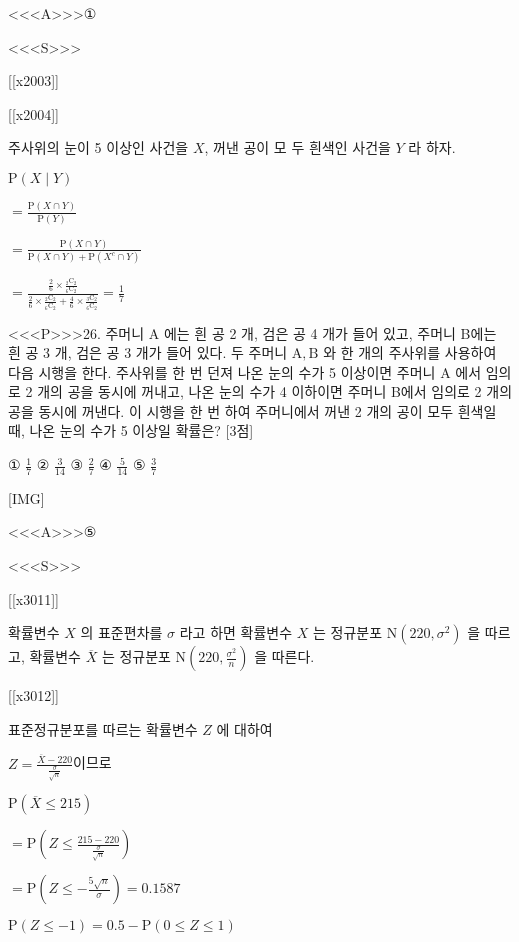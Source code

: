 \documentclass{oblivoir}
\begin{document}
<<<A>>>①

<<<S>>>

[[x2003]]

[[x2004]]

주사위의 눈이 5 이상인 사건을 $X$, 꺼낸 공이 모 두 흰색인 사건을 $Y$ 라 하자.

$\mathrm{P}(X \mid Y) $

$=\frac{\mathrm{P}(X \cap Y)}{\mathrm{P}(Y)}$

$=\frac{\mathrm{P}(X \cap Y)}{\mathrm{P}(X \cap Y)+\mathrm{P}\left(X^{c} \cap Y\right)}$

$=\frac{\frac{2}{6} \times \frac{{ }_{2} \mathrm{C}_{2}}{{ }_{6} \mathrm{C}_{2}}}{\frac{2}{6} \times \frac{{ }_{2} \mathrm{C}_{2}}{{ }_{6} \mathrm{C}_{2}}+\frac{4}{6} \times \frac{{ }_{3} \mathrm{C}_{2}}{{ }_{6} \mathrm{C}_{2}}}=\frac{1}{7}$


<<<P>>>26. 주머니 $\mathrm{A}$ 에는 흰 공 2 개, 검은 공 4 개가 들어 있고, 주머니 B에는 흰 공 3 개, 검은 공 3 개가 들어 있다.
두 주머니 $\mathrm{A}, \mathrm{B}$ 와 한 개의 주사위를 사용하여 다음 시행을 한다.
주사위를 한 번 던져
나온 눈의 수가 5 이상이면
주머니 $\mathrm{A}$ 에서 임의로 2 개의 공을 동시에 꺼내고,
나온 눈의 수가 4 이하이면
주머니 B에서 임의로 2 개의 공을 동시에 꺼낸다.
이 시행을 한 번 하여 주머니에서 꺼낸 2 개의 공이 모두 흰색일 때, 나온 눈의 수가 5 이상일 확률은? [3점]

① $\frac{1}{7}$
② $\frac{3}{14}$
③ $\frac{2}{7}$
④ $\frac{5}{14}$
⑤ $\frac{3}{7}$

[IMG]

<<<A>>>⑤

<<<S>>>

[[x3011]]

확률변수 $X$ 의 표준편차를 $\sigma$ 라고 하면
확률변수 $X$ 는 정규분포 $\mathrm{N}\left(220, \sigma^{2}\right)$ 을 따르고,
확률변수 $\overline{X}$ 는 정규분포 $\mathrm{N}\left(220, \frac{\sigma^{2}}{n}\right)$ 을 따른다.

[[x3012]]

표준정규분포를 따르는 확률변수 $Z$ 에 대하여

$Z=\frac{\overline{X}-220}{\frac{\sigma}{\sqrt{n}}}$이므로

$\mathrm{P}(\overline{X} \leq 215) $

$=\mathrm{P}\left(Z \leq \frac{215-220}{\frac{\sigma}{\sqrt{n}}}\right)$

$=\mathrm{P}\left(Z \leq-\frac{5 \sqrt{n}}{\sigma}\right)=0.1587$

$\mathrm{P}(Z \leq-1)=0.5-\mathrm{P}(0 \leq Z \leq 1)$
\end{document}
